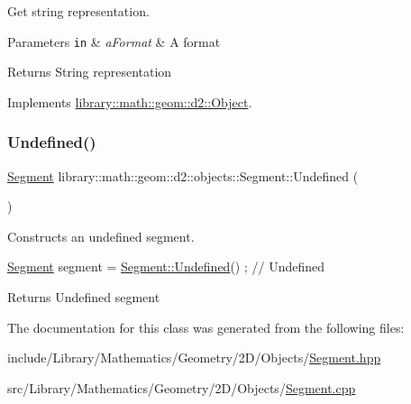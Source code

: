 Get string representation. 


\begin{DoxyParams}[1]{Parameters}
\mbox{\tt in}  & {\em a\+Format} & A format \\
\hline
\end{DoxyParams}
\begin{DoxyReturn}{Returns}
String representation 
\end{DoxyReturn}


Implements \hyperlink{classlibrary_1_1math_1_1geom_1_1d2_1_1_object_acdd76b3637732a249536b609dbe3f0eb}{library\+::math\+::geom\+::d2\+::\+Object}.

\mbox{\label{classlibrary_1_1math_1_1geom_1_1d2_1_1objects_1_1_segment_a8df8fa90e8294482a88fec4eb4c449f5}} 
\subsubsection{\texorpdfstring{Undefined()}{Undefined()}}
{\footnotesize\ttfamily \hyperlink{classlibrary_1_1math_1_1geom_1_1d2_1_1objects_1_1_segment}{Segment} library\+::math\+::geom\+::d2\+::objects\+::\+Segment\+::\+Undefined (\begin{DoxyParamCaption}{ }\end{DoxyParamCaption})\hspace{0.3cm}{\ttfamily [static]}}



Constructs an undefined segment. 


\begin{DoxyCode}
\hyperlink{classlibrary_1_1math_1_1geom_1_1d2_1_1objects_1_1_segment_a44ba44fd5f02a02fe34c40223b38fa8f}{Segment} segment = \hyperlink{classlibrary_1_1math_1_1geom_1_1d2_1_1objects_1_1_segment_a8df8fa90e8294482a88fec4eb4c449f5}{Segment::Undefined}() ; \textcolor{comment}{// Undefined}
\end{DoxyCode}


\begin{DoxyReturn}{Returns}
Undefined segment 
\end{DoxyReturn}


The documentation for this class was generated from the following files\+:\begin{DoxyCompactItemize}
\item 
include/\+Library/\+Mathematics/\+Geometry/2\+D/\+Objects/\hyperlink{2_d_2_objects_2_segment_8hpp}{Segment.\+hpp}\item 
src/\+Library/\+Mathematics/\+Geometry/2\+D/\+Objects/\hyperlink{2_d_2_objects_2_segment_8cpp}{Segment.\+cpp}\end{DoxyCompactItemize}
